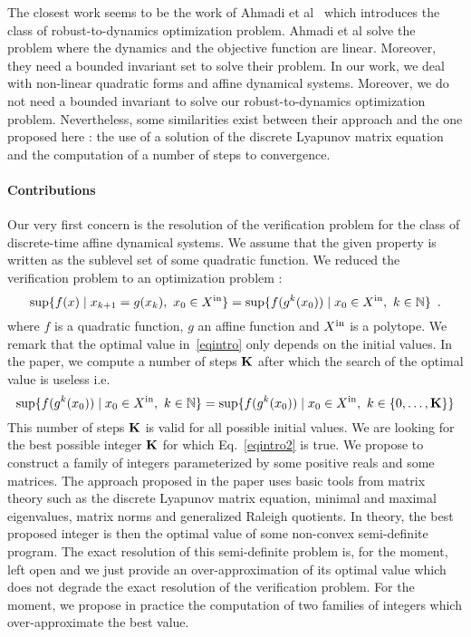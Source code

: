 \documentclass[10pt]{llncs}
\begin{document}
The closest work seems to be the work of Ahmadi et al~\cite{7403149,ahmadi2018robust} which introduces the class of robust-to-dynamics optimization problem. Ahmadi et al solve the problem where the dynamics and the objective function are linear. Moreover, they need a bounded invariant set to solve their problem. In our work, we deal with non-linear quadratic  forms and affine dynamical systems.  Moreover, we do not need a bounded invariant to solve our robust-to-dynamics optimization problem.  Nevertheless, some similarities exist between their approach and the one proposed here : the use of a solution of the discrete Lyapunov matrix equation and the computation of a number of steps to convergence.   
\paragraph{Contributions}
Our very first concern is the resolution of the verification problem for the class of discrete-time affine dynamical systems. We assume that the given property is written as the sublevel set of some quadratic function. 
We reduced the verification problem to an optimization problem :
\begin{equation}
\label{eqintro}
\sup\{f(x)\mid x_{k+1}=g(x_k),\ x_0\in X^\mathrm{in}\}=\sup\{f( g^k (x_0))\mid  x_0\in X^\mathrm{in},\ k\in\mathbb{N}\}\enspace.
\end{equation}
where $f$ is a quadratic function, $g$ an affine function and $X^\mathrm{in}$ is a polytope. We remark that the optimal value in~\eqref{eqintro} only depends on the initial values.
In the paper, we compute a number of steps $\mathbf{K}$ after which the search of the optimal value is useless i.e.
 \begin{equation}
\label{eqintro2}
\sup\{f( g^k (x_0))\mid  x_0\in X^\mathrm{in},\ k\in\mathbb{N}\}=
\sup\{f( g^k (x_0))\mid  x_0\in X^\mathrm{in},\ k\in \{0,\ldots,\mathbf{K}\}\}
\end{equation}
This number of steps $\mathbf{K}$ is valid for all possible initial values. We are looking for the best possible integer $\mathbf{K}$ for which 
Eq.~\eqref{eqintro2} is true. We propose to construct a family of integers parameterized by some positive reals and some matrices. The approach proposed in the paper uses basic tools from matrix theory such as the discrete Lyapunov matrix equation, minimal and maximal eigenvalues, matrix norms and generalized Raleigh quotients. In theory, the best proposed integer is then the optimal value of some non-convex semi-definite program.  
The exact resolution of this semi-definite problem is, for the moment, left open and we just provide an over-approximation of its optimal value which does not degrade the exact resolution of the verification problem.   For the moment, we propose in practice the computation of two families of integers which over-approximate the best value. 
\end{document}
